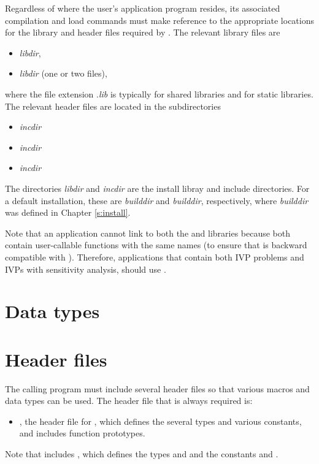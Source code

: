 Regardless of where the user's application program resides, its
associated compilation and load commands must make reference to the
appropriate locations for the library and header files required by
{\cvode}.  The relevant library files are
\begin{itemize}
\item {\em libdir},
\item {\em libdir} (one or two files),
\end{itemize}
where the file extension .{\em lib} is typically  for shared libraries
and  for static libraries. The relevant header files are located in
the subdirectories
\begin{itemize}
\item {\em incdir}
\item {\em incdir}
\item {\em incdir}
\end{itemize}
The directories {\em libdir} and {\em incdir} are the install libray and include
directories. For a default installation, these are {\em builddir} and
{\em builddir}, respectively, where {\em builddir} was defined in
Chapter \ref{s:install}.

Note that an application cannot link to both the {\cvode} and {\cvodes} libraries
because both contain user-callable functions with the same names (to ensure that {\cvodes}
is backward compatible with {\cvode}). Therefore, applications that contain both
IVP problems and IVPs with sensitivity analysis, should use {\cvodes}.

\section{Data types}\label{s:types}


\section{Header files}\label{ss:header_sim}
The calling program must include several header files so that various macros
and data types can be used. The header file that is always required is:
\begin{itemize}
\item  {}, 
  the header file for {\cvode}, which defines the several
  types and various constants, and includes function prototypes.
\end{itemize}
Note that  includes , 
which defines the types  and 
and the constants  and .

